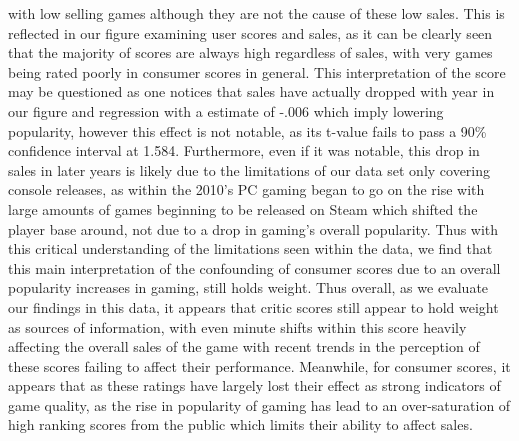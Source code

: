 \documentclass[12pt,english]{article}
\begin{document}
with low selling games although they are not the cause of these low sales. This is reflected in our 
figure examining user scores and sales, as it can be clearly seen that the majority of scores are 
always high regardless of sales, with very games being rated poorly in consumer scores in 
general. This interpretation of the score may be questioned as one notices that sales have actually 
dropped with year in our figure and regression with a estimate of -.006 which imply lowering 
popularity, however this effect is not notable, as its t-value fails to pass a 90\% confidence 
interval at 1.584. Furthermore, even if it was notable, this drop in sales in later years is likely due 
to the limitations of our data set only covering console releases, as within the 2010’s PC gaming 
began to go on the rise with large amounts of games beginning to be released on Steam which 
shifted the player base around, not due to a drop in gaming’s overall popularity. Thus with this 
critical understanding of the limitations seen within the data, we find that this main interpretation 
of the confounding of consumer scores due to an overall popularity increases in gaming, still 
holds weight. Thus overall, as we evaluate our findings in this data, it appears that critic scores 
still appear to hold weight as sources of information, with even minute shifts within this score 
heavily affecting the overall sales of the game with recent trends in the perception of these scores 
failing to affect their performance. Meanwhile, for consumer scores, it appears that as these 
ratings have largely lost their effect as strong indicators of game quality, as the rise in popularity 
of gaming has lead to an over-saturation of high ranking scores from the public which limits their 
ability to affect sales.
\end{document}
